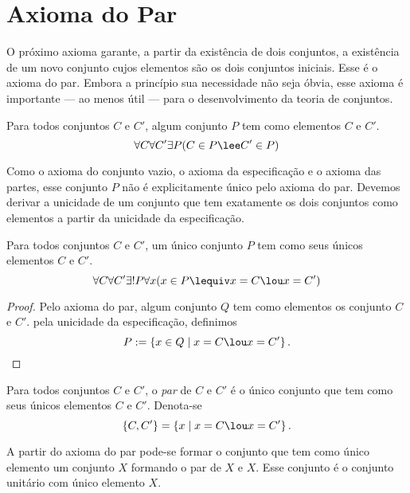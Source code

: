 \section{Axioma do Par}

O próximo axioma garante, a partir da existência de dois conjuntos, a existência de um novo conjunto cujos elementos são os dois conjuntos iniciais. Esse é o axioma do par. Embora a princípio sua necessidade não seja óbvia, esse axioma é importante --- ao menos útil --- para o desenvolvimento da teoria de conjuntos.

\begin{axi}[Par]
Para todos conjuntos $C$ e $C'$, algum conjunto $P$ tem como elementos $C$ e $C'$.
	\begin{equation*}
	\forall C \forall C' \exists P(C \in P \lee C' \in P)
	\end{equation*}
\end{axi}

Como o axioma do conjunto vazio, o axioma da especificação e o axioma das partes, esse conjunto $P$ não é explicitamente único pelo axioma do par. Devemos derivar a unicidade de um conjunto que tem exatamente os dois conjuntos como elementos a partir da unicidade da especificação.

\begin{prop}
Para todos conjuntos $C$ e $C'$, um único conjunto $P$ tem como seus únicos elementos $C$ e $C'$.
	\begin{equation*}
	\forall C \forall C' \exists ! P\forall x(x \in P \lequiv x=C \lou x=C')
	\end{equation*}
\end{prop}
\begin{proof}
Pelo axioma do par, algum conjunto $Q$ tem como elementos os conjunto $C$ e $C'$. pela unicidade da especificação, definimos
	\begin{equation*}
	P := \set{x \in Q}{x=C \lou x=C'}. \qedhere
	\end{equation*}
\end{proof}

\begin{defi}
Para todos conjuntos $C$ e $C'$, o \emph{par} de $C$ e $C'$ é o único conjunto que tem como seus únicos elementos $C$ e $C'$. Denota-se
	\begin{equation*}
	\{C,C'\} = \set{x}{x=C \lou x=C'}.
	\end{equation*}
\end{defi}

A partir do axioma do par pode-se formar o conjunto que tem como único elemento um conjunto $X$ formando o par de $X$ e $X$. Esse conjunto é o conjunto unitário com único elemento $X$.

